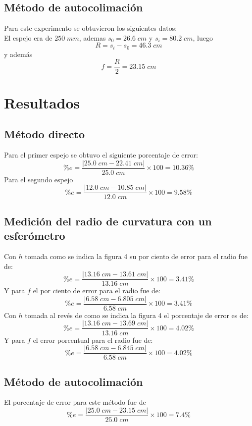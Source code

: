 \documentclass[13,twocolumn,letterpaper]{article}
\begin{document}
{\subsection*{Método de autocolimación}
{
	
	
	Para este experimento se obtuvieron los siguientes datos:\\
	El espejo era de $250\;mm$, ademas $s_{0}=26.6 \;cm$ y $s_{i}=80.2 \;cm$, luego $$R=s_{i}-s_{0}=46.3\; cm$$
	y además $$f=\dfrac{R}{2}=23.15\;cm$$
	
}

}

\section*{Resultados}
{

\subsection*{Método directo}
{
Para el primer espejo se obtuvo el siguiente porcentaje de error:
$$\%e=\dfrac{|25.0\;cm - 22.41\;cm|}{25.0\; cm}\times 100=10.36\%$$
Para el segundo espejo
$$\%e=\dfrac{|12.0\;cm - 10.85\;cm|}{12.0\; cm}\times 100=9.58\%$$	
}
\subsection*{Medición del radio de curvatura con un esferómetro}
{
Con $h$ tomada como se indica la figura 4 su por ciento de error para el radio fue de:
$$\%e=\dfrac{|13.16\;cm - 13.61\;cm|}{13.16\; cm}\times 100=3.41\%$$
Y para $f$ el por ciento de error para el radio fue de:
$$\%e=\dfrac{|6.58\;cm - 6.805\;cm|}{6.58\; cm}\times 100=3.41\%$$
Con $h$ tomada al revés de  como se indica la figura 4 el porcentaje de error es de:	
$$\%e=\dfrac{|13.16\;cm - 13.69\;cm|}{13.16\; cm}\times 100=4.02\%$$
Y para $f$ el error porcentual para el radio fue de:
$$\%e=\dfrac{|6.58\;cm - 6.845\;cm|}{6.58\; cm}\times 100=4.02\%$$
}
\subsection*{Método de autocolimación}
{
El porcentaje de error para este método fue de
 	$$\%e=\dfrac{|25.0\;cm - 23.15\;cm|}{25.0\; cm}\times 100=7.4\%$$
}

}
\end{document}
